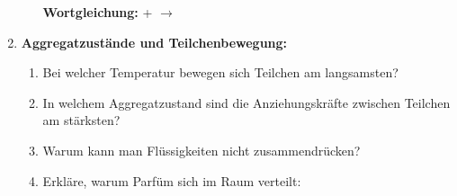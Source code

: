 \begin{enumerate}[label=\arabic*.]
\begin{enumerate}[label=\alph*)]
        \textbf{Wortgleichung:} \underline{\hspace{3cm}} + \underline{\hspace{3cm}} $\rightarrow$ \underline{\hspace{3cm}}
        \vspace{1cm}
    \end{enumerate}

    \vspace{1cm}

    \item \textbf{Aggregatzustände und Teilchenbewegung:}
    \vspace{0.5cm}

    \begin{enumerate}[label=\alph*)]
        \item Bei welcher Temperatur bewegen sich Teilchen am langsamsten? \underline{\hspace{4cm}}

        \item In welchem Aggregatzustand sind die Anziehungskräfte zwischen Teilchen am stärksten? \underline{\hspace{4cm}}

        \item Warum kann man Flüssigkeiten nicht zusammendrücken? 
        \vspace{1cm}

        \item Erkläre, warum Parfüm sich im Raum verteilt:
        \vspace{1cm}
    \end{enumerate}

\end{enumerate}